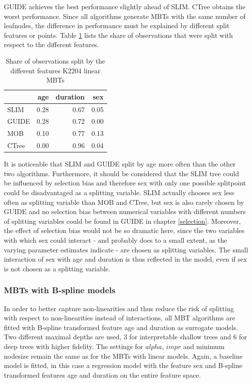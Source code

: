 GUIDE achieves the best performance slightly ahead of SLIM. CTree obtains the worst performance.
Since all algorithms generate MBTs with the same number of leafnodes, the difference in performance must be explained by different split features or points.
Table \ref{tab:ins_k2204_lm_surrogates_share} lists the share of observations that were split with respect to the different features.

\begin{table}[!htb]

\centering \scriptsize
\begin{tabular}[t]{l|r|r|r}
\hline
& age & duration & sex\\
\hline
SLIM & 0.28 & 0.67 & 0.05\\
GUIDE & 0.28 & 0.72 & 0.00\\
MOB & 0.10 & 0.77 & 0.13\\
CTree & 0.00 & 0.96 & 0.04\\
\hline
\end{tabular}
\caption{Share of observations split by the different features K2204 linear MBTs}
\label{tab:ins_k2204_lm_surrogates_share}
\end{table}


It is noticeable that SLIM and GUIDE split by age more often than the other two algorithms.
Furthermore, it should be considered that the SLIM tree could be influenced by selection bias and therefore sex with only one possible splitpoint could be disadvantaged as a splitting variable. SLIM actually chooses sex less often as splitting variable than MOB and CTree, but sex is also rarely chosen by GUIDE and no selection bias between numerical variables with different numbers of splitting variables could be found in GUIDE in chapter \ref{selection}. 
Moreover, the effect of selection bias would not be so dramatic here, since the two variables with which sex could interact - and probably does to a small extent, as the varying parameter estimates indicate - are chosen as splitting variables. The small interaction of sex with age and duration is thus reflected in the model, even if sex is not chosen as a splitting variable.

\subsubsection{MBTs with B-spline models}

In order to better capture non-linearities and thus reduce the risk of splitting with respect to non-linearities instead of interactions, all MBT algorithms are fitted with B-spline transformed feature age and duration as surrogate models. 
Two different maximal depths are used, 3 for interpretable shallow trees and 6 for deep trees with higher fidelity. The settings for $alpha$, $impr$ and minimum nodesize remain the same as for the MBTs with linear models.  Again, a baseline model is fitted, in this case a regression model with the feature sex and B-spline transformed features age and duration on the entire feature space. 

